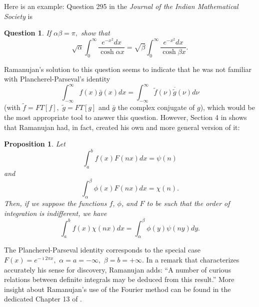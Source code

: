 \documentclass[11pt,oneside,reqno]{article}
\newtheorem*{proposition}{Proposition}
\newtheorem*{question}{Question}
\theoremstyle{definition}
\begin{document}
Here is an example:  Question 295 \cite[p.324]{Ramanujan Collected}  in the {\it Journal of the Indian Mathematical Society} is
\begin{question}
    If $\alpha \beta = \pi,$ show that
    \[
    \sqrt{\alpha} \int_{0}^{\infty} \frac{e^{-x^2}dx}{\cosh \alpha x} = \sqrt{\beta} \int_{0}^{\infty} \frac{e^{-x^2}dx}{\cosh \beta x}.
    \]
\end{question} 
Ramanujan's solution to this question seems to indicate that he was not familiar with  Plancherel-Parseval's identity
\[
\int_{-\infty}^{\infty}f(x)\bar{g}(x)dx = \int_{-\infty}^{\infty}\tilde{f}(\nu)\overline{\tilde{g}}(\nu)d\nu
\]
(with $\tilde{f}=FT\left[f\right],$ $\tilde{g}=FT\left[g\right]$ and $\bar{g}$ the complex conjugate of $g$),
which would be the most appropriate tool to answer this question. However, Section 4 in \cite[p.55]{Ramanujan Collected} shows that Ramanujan had, in fact, created his own  and more general version of it:
\begin{proposition}
    Let
    \[
    \int_{a}^{b} f(x)F(nx)dx = \psi(n)
    \]
    and
    \[
    \int_{\alpha}^{\beta} \phi(x)F(nx)dx = \chi(n).
    \]
    Then, if we suppose the functions $f$, $\phi$, and $F$ to be such that the order of integration is indifferent, we have
    \[
    \int_{a}^{b} f(x)\chi(nx)dx =\int_{\alpha}^{\beta} \phi(y)\psi(ny)dy.
    \]
\end{proposition}
The Plancherel-Parseval identity corresponds to the special case $F(x)=e^{-\imath 2 \pi x},\,\,\alpha=a=-\infty,\,\,\beta=b=+\infty.$ In a remark that characterizes accurately his sense for discovery, Ramanujan adds: 
``A number of curious relations between definite integrals may be deduced from this result.''
More insight about Ramanujan's use of the Fourier method can be found in the dedicated Chapter 13 of \cite{R4Lost}.\\

    
\end{document}
